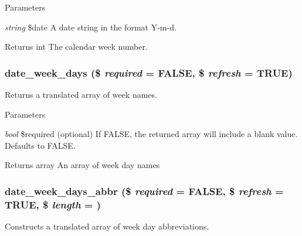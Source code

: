 \begin{DoxyParams}{Parameters}
\item[{\em string}]\$date A date string in the format Y-\/m-\/d.\end{DoxyParams}
\begin{DoxyReturn}{Returns}
int The calendar week number. 
\end{DoxyReturn}
\hypertarget{date__api_8module_a55bb6dd6b7339529dda05114c86634a8}{
\subsubsection[{date\_\-week\_\-days}]{\setlength{\rightskip}{0pt plus 5cm}date\_\-week\_\-days (\$ {\em required} = {\ttfamily FALSE}, \/  \$ {\em refresh} = {\ttfamily TRUE})}}
\label{date__api_8module_a55bb6dd6b7339529dda05114c86634a8}
Returns a translated array of week names.


\begin{DoxyParams}{Parameters}
\item[{\em bool}]\$required (optional) If FALSE, the returned array will include a blank value. Defaults to FALSE.\end{DoxyParams}
\begin{DoxyReturn}{Returns}
array An array of week day names 
\end{DoxyReturn}
\hypertarget{date__api_8module_a8707af09814a3667fe2dc426ad1df671}{
\subsubsection[{date\_\-week\_\-days\_\-abbr}]{\setlength{\rightskip}{0pt plus 5cm}date\_\-week\_\-days\_\-abbr (\$ {\em required} = {\ttfamily FALSE}, \/  \$ {\em refresh} = {\ttfamily TRUE}, \/  \$ {\em length} = {})}}
\label{date__api_8module_a8707af09814a3667fe2dc426ad1df671}
Constructs a translated array of week day abbreviations.


